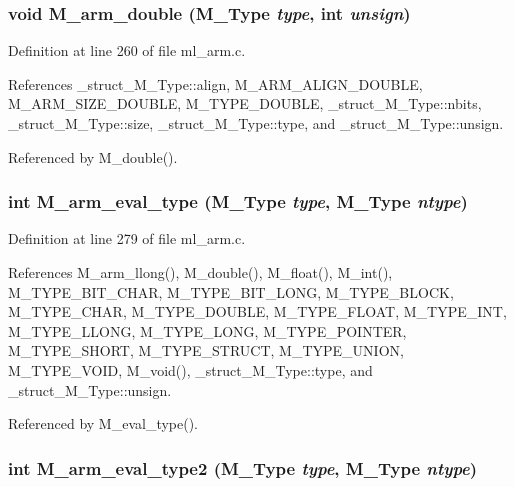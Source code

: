\subsubsection{\setlength{\rightskip}{0pt plus 5cm}void M\_\-arm\_\-double (\bf{M\_\-Type} {\em type}, int {\em unsign})}\label{m__arm_8h_a2d09b63a067761cd3179cdc3cb0dadf}




Definition at line 260 of file ml\_\-arm.c.

References \_\-struct\_\-M\_\-Type::align, M\_\-ARM\_\-ALIGN\_\-DOUBLE, M\_\-ARM\_\-SIZE\_\-DOUBLE, M\_\-TYPE\_\-DOUBLE, \_\-struct\_\-M\_\-Type::nbits, \_\-struct\_\-M\_\-Type::size, \_\-struct\_\-M\_\-Type::type, and \_\-struct\_\-M\_\-Type::unsign.

Referenced by M\_\-double().
\subsubsection{\setlength{\rightskip}{0pt plus 5cm}int M\_\-arm\_\-eval\_\-type (\bf{M\_\-Type} {\em type}, \bf{M\_\-Type} {\em ntype})}\label{m__arm_8h_89cf94615c88cfe735177b54c0e35983}




Definition at line 279 of file ml\_\-arm.c.

References M\_\-arm\_\-llong(), M\_\-double(), M\_\-float(), M\_\-int(), M\_\-TYPE\_\-BIT\_\-CHAR, M\_\-TYPE\_\-BIT\_\-LONG, M\_\-TYPE\_\-BLOCK, M\_\-TYPE\_\-CHAR, M\_\-TYPE\_\-DOUBLE, M\_\-TYPE\_\-FLOAT, M\_\-TYPE\_\-INT, M\_\-TYPE\_\-LLONG, M\_\-TYPE\_\-LONG, M\_\-TYPE\_\-POINTER, M\_\-TYPE\_\-SHORT, M\_\-TYPE\_\-STRUCT, M\_\-TYPE\_\-UNION, M\_\-TYPE\_\-VOID, M\_\-void(), \_\-struct\_\-M\_\-Type::type, and \_\-struct\_\-M\_\-Type::unsign.

Referenced by M\_\-eval\_\-type().
\subsubsection{\setlength{\rightskip}{0pt plus 5cm}int M\_\-arm\_\-eval\_\-type2 (\bf{M\_\-Type} {\em type}, \bf{M\_\-Type} {\em ntype})}\label{m__arm_8h_8b5e168794dd25817f2606b4816ef3f7}




